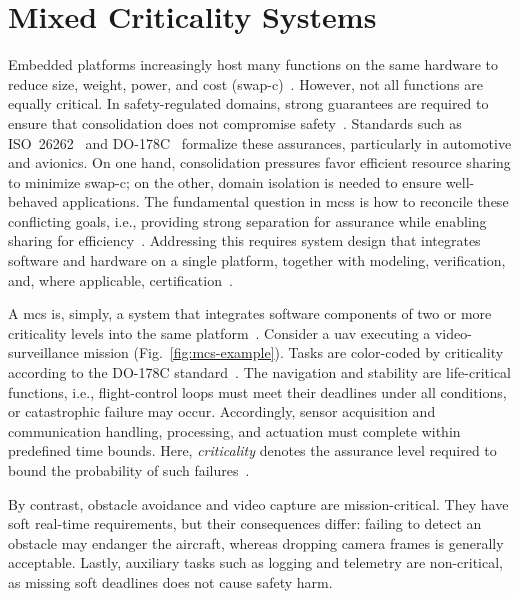 \section{Mixed Criticality Systems}%
\label{sec:mixed-crit-syst}
Embedded platforms increasingly host many functions on the same hardware to
reduce size, weight, power, and cost
(\gls{swap-c})~\cite{burns2022mixed}. However, not all functions are equally
critical. In safety-regulated domains, strong guarantees are required to ensure
that consolidation does not compromise
safety~\cite{burns2022mixed,davis_mixed_2018}.
%
Standards such as ISO~26262~\cite{iso26262} and
DO-178C~\cite{sc_167_software_1992} formalize these assurances, particularly in
automotive and avionics. On one hand, consolidation pressures favor efficient
resource sharing to minimize \gls{swap-c}; on the other, domain isolation is
needed to ensure well-behaved applications.
The fundamental question in
\glspl{mcs} is how to reconcile these conflicting goals, i.e., providing strong
separation for assurance while enabling sharing for efficiency~\cite{burns2022mixed}. Addressing this
requires system design that integrates software and hardware on a single
platform, together with modeling, verification, and, where applicable,
certification~\cite{davis_mixed_2018,youn_software_2015}.

A \gls{mcs} is, simply, a system that integrates software components of two or
more criticality levels into the same platform~\cite{davis_mixed_2018}. Consider a \gls{uav} executing a
video-surveillance mission (Fig.~\ref{fig:mcs-example}). Tasks are color-coded
by criticality according to
the DO-178C standard~\cite{sc_167_software_1992,youn_software_2015}. The navigation and stability
are life-critical functions, i.e., flight-control loops must meet their deadlines under all
conditions, or catastrophic failure may occur. Accordingly, sensor acquisition
and communication handling, processing, and actuation must complete within
predefined time bounds. Here, \emph{criticality} denotes the assurance level
required to bound the probability of such failures~\cite{sc_167_software_1992,youn_software_2015}.

By contrast, obstacle avoidance and video capture are mission-critical. They
have soft real-time requirements, but their consequences differ: failing to
detect an obstacle may endanger the aircraft, whereas dropping camera frames is
generally acceptable. Lastly, auxiliary tasks such as logging and telemetry are
non-critical, as missing soft deadlines does not cause safety harm.

